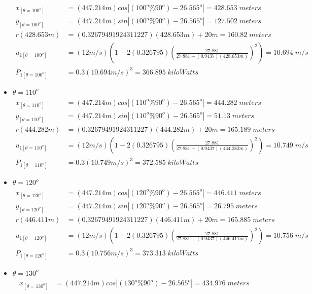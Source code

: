 \begin{itemize}
	\begin{align*}%
		x_{[\theta=100^o]} &=(447.214m) cos\left| (100^o\%90^o) - 26.565^o \right|  =428.653\;meters \\
		y_{[\theta=100^o]} &=(447.214m) sin\left| (100^o\%90^o) - 26.565^o \right|  =127.502\;meters \\
		r(428.653m) &=(0.32679491924311227)(428.653m)+20m  =160.82\;meters\\
		u_{1[\theta=100^o]} &=(12m/s)\left( 1-2(0.326795)\left( \frac{27.881}{27.881+(0.9437)(428.653m)} \right)^2 \right) =10.694\;m/s \\
		P_{1[\theta=100^o]} &=0.3(10.694m/s)^3  =366.895\;kiloWatts
\end{align*}
\item $\theta=110^o$
	\begin{align*}%
		x_{[\theta=110^o]} &=(447.214m) cos\left| (110^o\%90^o) - 26.565^o \right|  =444.282\;meters \\
		y_{[\theta=110^o]} &=(447.214m) sin\left| (110^o\%90^o) - 26.565^o \right|  =51.13\;meters \\
		r(444.282m) &=(0.32679491924311227)(444.282m)+20m  =165.189\;meters\\
		u_{1[\theta=110^o]} &=(12m/s)\left( 1-2(0.326795)\left( \frac{27.881}{27.881+(0.9437)(444.282m)} \right)^2 \right) =10.749\;m/s \\
		P_{1[\theta=110^o]} &=0.3(10.749m/s)^3  =372.585\;kiloWatts
\end{align*}
\item $\theta=120^o$
	\begin{align*}%
		x_{[\theta=120^o]} &=(447.214m) cos\left| (120^o\%90^o) - 26.565^o \right|  =446.411\;meters \\
		y_{[\theta=120^o]} &=(447.214m) sin\left| (120^o\%90^o) - 26.565^o \right|  =26.795\;meters \\
		r(446.411m) &=(0.32679491924311227)(446.411m)+20m  =165.885\;meters\\
		u_{1[\theta=120^o]} &=(12m/s)\left( 1-2(0.326795)\left( \frac{27.881}{27.881+(0.9437)(446.411m)} \right)^2 \right) =10.756\;m/s \\
		P_{1[\theta=120^o]} &=0.3(10.756m/s)^3  =373.313\;kiloWatts
\end{align*}
\item $\theta=130^o$
	\begin{align*}%
		x_{[\theta=130^o]} &=(447.214m) cos\left| (130^o\%90^o) - 26.565^o \right|  =434.976\;meters \\

\end{align*}
\end{itemize}
